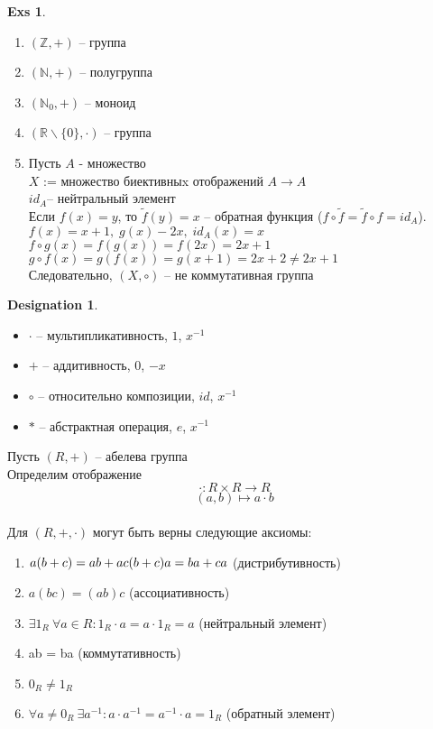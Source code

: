 \documentclass[11pt]{book}
\theoremstyle{definition}
\theoremstyle{plain}
\theoremstyle{plain}
\theoremstyle{definition}
\newtheorem*{exs}{Exs}
\newtheorem*{name}{Designation}
\theoremstyle{remark}
\begin{document}
\begin{exs}$ $
\begin{enumerate}
    \item $(\mathbb{Z}, + )$ -- группа
    \item $(\mathbb{N}, + )$ -- полугруппа
    \item $(\mathbb N_0 , +)$ -- моноид
    \item $(\mathbb R \backslash \{0\}, \cdot)$ -- группа
    \item Пусть $A$ - множество\\
	$X$ := множество биективныx отображений $A \to A$\\
	$id_A $-- нейтральный элемент\\
	Если $f(x) = y$, то $\tilde f (y) = x$ -- обратная функция ($f \circ \tilde f = \tilde f \circ f = id_A$).\\
	$f(x) = x+1,\; g(x) - 2x,\;id_A(x)=x$\\
	$f \circ g(x) = f(g(x)) = f(2x) = 2x + 1$\\
	$g \circ f(x) = g(f(x)) = g(x+1) = 2x + 2 \ne 2x+1$\\
	Следовательно, $(X, \circ)$ -- не коммутативная группа
\end{enumerate}
\end{exs}

\begin{name}$ $
\begin{itemize}
    \item $\cdot$ -- мультипликативность, $1$, $x^{-1}$
    \item $+$ -- аддитивность, $0$, $-x$
    \item $\circ$ -- относительно композиции, $id$, $x^{-1}$
    \item $*$ -- абстрактная операция, $e$, $x^{-1}$
\end{itemize}
\end{name}

 Пусть $(R, +)$ -- абелева группа\\
Определим отображение
$$\cdot: R \times R \to R$$
$$  (a,b) \mapsto a \cdot b$$\\
Для $(R, +, \cdot)$ могут быть верны следующие аксиомы:
\begin{enumerate}
    \setcounter{enumi}{+4}
    \item $a(b+c) = ab + ac\\ 
	(b+c)a = ba + ca$ (дистрибутивность)
    \item $a(bc) = (ab)c$ (ассоциативность)
    \item $\exists 1_R \: \forall a \in R: 1_R \cdot a = a \cdot 1_R = a$ (нейтральный элемент)
    \item ab = ba (коммутативность)
    \item $0_R \ne 1_R$
    \item $\forall a \ne 0_R \: \exists a^{-1}: a \cdot a^{-1} = a^{-1} \cdot a = 1_R$ (обратный элемент)
\end{enumerate}
\end{document}
